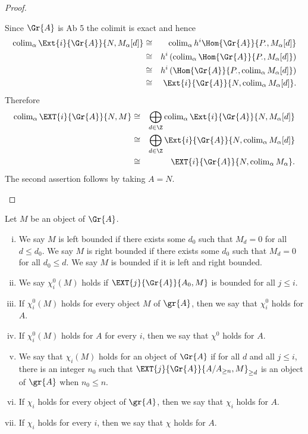\documentclass[10pt]{amsart}
\begin{document}
\begin{prop}
\begin{proof}
\begin{enumerate}
      Since $\Gr{A}$ is Ab 5 the colimit is exact and hence
      \begin{eqnarray*}
        \operatorname{colim}_\alpha \Ext{i}{\Gr{A}}{N, M_\alpha[d]}
        &\cong& \operatorname{colim}_\alpha h^i\Hom{\Gr{A}}{P_\cdot, M_\alpha[d]}\\
        &\cong& h^i\left(\operatorname{colim}_\alpha \Hom{\Gr{A}}{P_\cdot, M_\alpha[d]} \right)\\
        &\cong& h^i\left(\Hom{\Gr{A}}{P_\cdot, \operatorname{colim}_\alpha M_\alpha[d]}\right)\\
        &\cong& \Ext{i}{\Gr{A}}{N, \operatorname{colim}_\alpha M_\alpha[d]}.
      \end{eqnarray*}
      Therefore 
      \begin{eqnarray*}
        \operatorname{colim}_\alpha \EXT{i}{\Gr{A}}{N,M} 
        &\cong& \bigoplus_{d \in \Z}\operatorname{colim}_\alpha \Ext{i}{\Gr{A}}{N, M_\alpha[d]}\\
        &\cong& \bigoplus_{d \in \Z}\Ext{i}{\Gr{A}}{N, \operatorname{colim}_\alpha M_\alpha[d]}\\
        &\cong& \EXT{i}{\Gr{A}}{N, \operatorname{colim}_\alpha M_\alpha}.
      \end{eqnarray*}
      The second assertion follows by taking $A = N$.
    \end{enumerate}
  \end{proof}

  \begin{defn}
    Let $M$ be an object of $\Gr{A}$.
    \begin{enumerate}[(i)]
    \item
      We say $M$ is left bounded if there exists some $d_0$ such that $M_d = 0$ for all $d \leq d_0$.
      We say $M$ is right bounded if there exists some $d_0$ such that $M_d = 0$ for all $d_0 \leq d$.
      We say $M$ is bounded if it is left and right bounded.
    \item
      We say $\chi_i^0(M)$ holds if $\EXT{j}{\Gr{A}}{A_0, M}$ is bounded for all $j \leq i$.
    \item
      If $\chi^0_i(M)$ holds for every object $M$ of $\gr{A}$, then we say that $\chi^0_i$ holds for $A$.
    \item
      If $\chi^0_i(M)$ holds for $A$ for every $i$, then we say that $\chi^0$ holds for $A$.
    \item
      We say that $\chi_i(M)$ holds for an object of $\Gr{A}$ if for all $d$ and all $j \leq i$, there is an integer $n_0$ such that $\EXT{j}{\Gr{A}}{A/A_{\geq n}, M}_{\geq d}$ is an object of $\gr{A}$ when $n_0 \leq n$.
    \item
      If $\chi_i$ holds for every object of $\gr{A}$, then we say that $\chi_i$ holds for $A$.
    \item
      If $\chi_i$ holds for every $i$, then we say that $\chi$ holds for $A$.
    \end{enumerate}
  \end{defn}


\end{prop}
\end{document}
